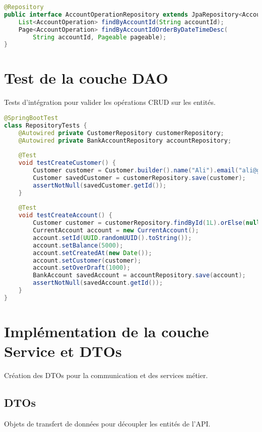 \documentclass[12pt,a4paper]{report}
\begin{document}
\begin{lstlisting}[language=Java, caption=AccountOperationRepository.java]
@Repository
public interface AccountOperationRepository extends JpaRepository<AccountOperation, Long> {
    List<AccountOperation> findByAccountId(String accountId);
    Page<AccountOperation> findByAccountIdOrderByDateTimeDesc(
        String accountId, Pageable pageable);
}
\end{lstlisting}

\section{Test de la couche DAO}
Tests d'intégration pour valider les opérations CRUD sur les entités.

\begin{lstlisting}[language=Java, caption=RepositoryTests.java]
@SpringBootTest
class RepositoryTests {
    @Autowired private CustomerRepository customerRepository;
    @Autowired private BankAccountRepository accountRepository;
    
    @Test
    void testCreateCustomer() {
        Customer customer = Customer.builder().name("Ali").email("ali@gmail.com").build();
        Customer savedCustomer = customerRepository.save(customer);
        assertNotNull(savedCustomer.getId());
    }
    
    @Test
    void testCreateAccount() {
        Customer customer = customerRepository.findById(1L).orElse(null);
        CurrentAccount account = new CurrentAccount();
        account.setId(UUID.randomUUID().toString());
        account.setBalance(5000);
        account.setCreatedAt(new Date());
        account.setCustomer(customer);
        account.setOverDraft(1000);
        BankAccount savedAccount = accountRepository.save(account);
        assertNotNull(savedAccount.getId());
    }
}
\end{lstlisting}

\section{Implémentation de la couche Service et DTOs}
Création des DTOs pour la communication et des services métier.

\subsection{DTOs}
Objets de transfert de données pour découpler les entités de l'API.
\end{document}
